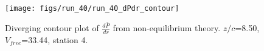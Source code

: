 \begin{figure}[H]
\centering
\texttt{[image: figs/run\_40/run\_40\_dPdr\_contour]}
\caption{Diverging contour plot of $\frac{d\bar{P}}{dr}$ from non-equilibrium theory. $z/c$=8.50, $V_{free}$=33.44, station 4.}
\label{fig:run_40_dPdr_contour}
\end{figure}


